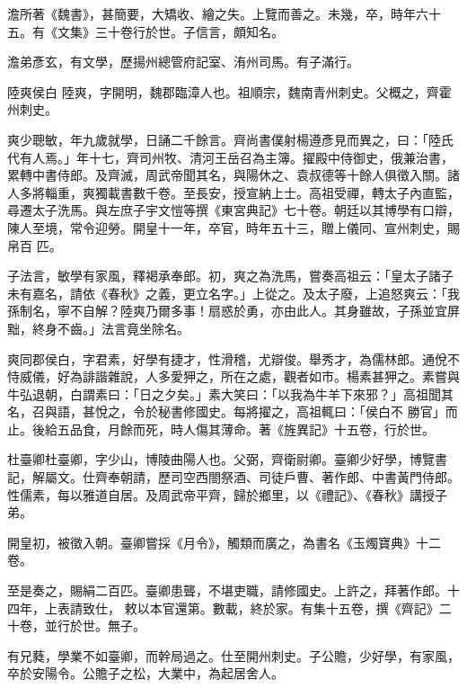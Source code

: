 \begin{pinyinscope}
 澹所著《魏書》，甚簡要，大矯收、繪之失。上覽而善之。未幾，卒，時年六十五。有《文集》三十卷行於世。子信言，頗知名。



 澹弟彥玄，有文學，歷揚州總管府記室、洧州司馬。有子滿行。



 陸爽侯白
 陸爽，字開明，魏郡臨漳人也。祖順宗，魏南青州刺史。父概之，齊霍州刺史。



 爽少聰敏，年九歲就學，日誦二千餘言。齊尚書僕射楊遵彥見而異之，曰：「陸氏代有人焉。」年十七，齊司州牧、清河王岳召為主簿。擢殿中侍御史，俄兼治書，累轉中書侍郎。及齊滅，周武帝聞其名，與陽休之、袁叔德等十餘人俱徵入關。諸人多將輜重，爽獨載書數千卷。至長安，授宣納上士。高祖受禪，轉太子內直監，尋遷太子洗馬。與左庶子宇文愷等撰《東宮典記》七十卷。朝廷以其博學有口辯，陳人至境，常令迎勞。開皇十一年，卒官，時年五十三，贈上儀同、宣州刺史，賜帛百
 匹。



 子法言，敏學有家風，釋褐承奉郎。初，爽之為洗馬，嘗奏高祖云：「皇太子諸子未有嘉名，請依《春秋》之義，更立名字。」上從之。及太子廢，上追怒爽云：「我孫制名，寧不自解？陸爽乃爾多事！扇惑於勇，亦由此人。其身雖故，子孫並宜屏黜，終身不齒。」法言竟坐除名。



 爽同郡侯白，字君素，好學有捷才，性滑稽，尤辯俊。舉秀才，為儒林郎。通侻不恃威儀，好為誹諧雜說，人多愛狎之，所在之處，觀者如市。楊素甚狎之。素嘗與牛弘退朝，白謂素曰：「日之夕矣。」素大笑曰：「以我為牛羊下來邪？」高祖聞其名，召與語，甚悅之，令於秘書修國史。每將擢之，高祖輒曰：「侯白不
 勝官」而止。後給五品食，月餘而死，時人傷其薄命。著《旌異記》十五卷，行於世。



 杜臺卿杜臺卿，字少山，博陵曲陽人也。父弼，齊衛尉卿。臺卿少好學，博覽書記，解屬文。仕齊奉朝請，歷司空西閤祭酒、司徒戶曹、著作郎、中書黃門侍郎。性儒素，每以雅道自居。及周武帝平齊，歸於鄉里，以《禮記》、《春秋》講授子弟。



 開皇初，被徵入朝。臺卿嘗採《月令》，觸類而廣之，為書名《玉燭寶典》十二卷。



 至是奏之，賜絹二百匹。臺卿患聾，不堪吏職，請修國史。上許之，拜著作郎。十四年，上表請致仕，
 敕以本官還第。數載，終於家。有集十五卷，撰《齊記》二十卷，並行於世。無子。



 有兄蕤，學業不如臺卿，而幹局過之。仕至開州刺史。子公贍，少好學，有家風，卒於安陽令。公贍子之松，大業中，為起居舍人。




\end{pinyinscope}
